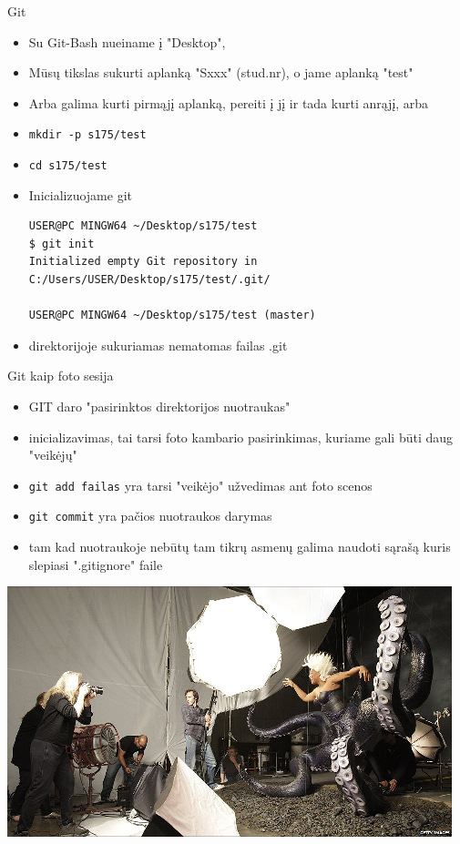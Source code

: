 \documentclass[11pt,xcolor=table]{beamer}
\begin{document}
\begin{frame}[fragile]{Git}
\begin{itemize}
\item Su Git-Bash nueiname į "Desktop",
\item Mūsų tikslas sukurti aplanką "Sxxx" (stud.nr), o jame aplanką "test"
\item Arba galima kurti pirmąjį aplanką, pereiti į jį ir tada kurti anrąjį, arba
\item \colorbox{listinggray}{\lstinline|mkdir -p s175/test|}
\item \colorbox{listinggray}{\lstinline|cd s175/test|}
\item Inicializuojame git
\begin{lstlisting}
USER@PC MINGW64 ~/Desktop/s175/test
$ git init
Initialized empty Git repository in C:/Users/USER/Desktop/s175/test/.git/

USER@PC MINGW64 ~/Desktop/s175/test (master)

\end{lstlisting}
\item direktorijoje sukuriamas nematomas failas .git
\end{itemize}
\end{frame}


\begin{frame}{Git kaip foto sesija}
\begin{itemize}
\item GIT daro "pasirinktos direktorijos nuotraukas" 
\item inicializavimas, tai tarsi foto kambario pasirinkimas, kuriame gali būti daug "veikėjų"
\item \colorbox{listinggray}{\lstinline|git add failas|} yra tarsi "veikėjo" užvedimas ant foto scenos
\item \colorbox{listinggray}{\lstinline|git commit|} yra pačios nuotraukos darymas
\item tam kad nuotraukoje nebūtų tam tikrų asmenų galima naudoti sąrašą kuris slepiasi ".gitignore" faile
\end{itemize}
\center
\includegraphics[scale=0.4]{photo_session.png}
\end{frame}
\end{document}
